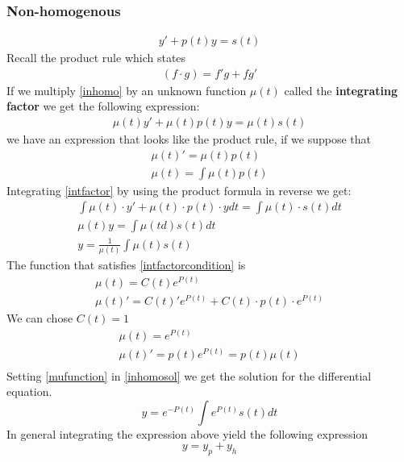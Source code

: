 \subsubsection{Non-homogenous}
\begin{gather}\label{inhomo}
   y' + p(t)y = s(t)
\end{gather}
Recall the product rule which states
\begin{gather}
   (f \cdot g) = f' g + f g'
\end{gather}
If we multiply \ref{inhomo} by an unknown function \(\mu(t)\) called the \textbf{integrating factor} we get the following expression:
\begin{gather}\label{intfactor}
   \mu(t) y' + \mu(t) p(t)y = \mu(t) s(t)
\end{gather}
we have an expression that looks like the product rule, if we suppose that
\begin{gather}\label{intfactorcondition}
   \mu(t)' =  \mu(t) p(t) \\
   \mu(t) = \int \mu(t) p(t)
\end{gather}
Integrating \ref{intfactor} by using the product formula in reverse we get:
\begin{gather}
   \int \mu(t) \cdot y' + \mu(t)\cdot p(t) \cdot y  dt = \int \mu(t) \cdot s(t) dt \\
   \mu (t) y = \int \mu(td) s(t) dt \\
   y = \frac{1}{\mu(t)}\int \mu(t) s(t)  \label{inhomosol}
\end{gather}
The function that satisfies \ref{intfactorcondition} is
\begin{gather}
   \mu(t) = C(t) e^{P(t)}\\
   \mu(t)' = C(t)' e^{P(t)} + C(t) \cdot p(t) \cdot e^{P(t)}
\end{gather}
We can chose \(C(t) = 1\)
\begin{gather}
   \mu(t)  = e^{P(t)} \label{mufunction}\\
   \mu(t)' = p(t)e^{P(t)} = p(t)\mu(t)\\
\end{gather}
Setting \ref{mufunction} in \ref{inhomosol} we get the solution for the differential equation.
\begin{equation}
   y = e^{-P(t)}\int e^{P(t)} s(t)dt
\end{equation}
In general integrating the expression above yield the following expression
\begin{equation}
   y = y_p + y_h
\end{equation}
